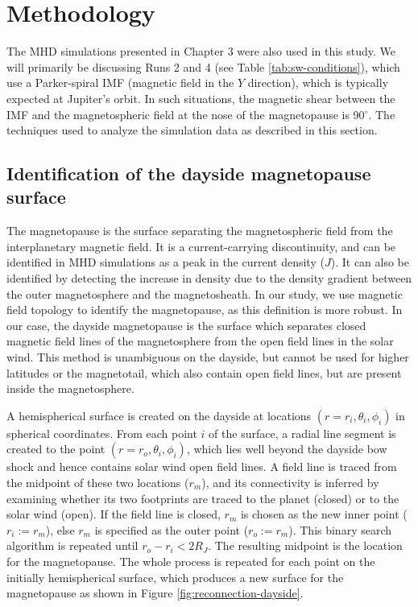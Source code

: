 \section{Methodology}
The MHD simulations presented in Chapter 3 were also used in this study. We will primarily be discussing Runs 2 and 4 (see Table \ref{tab:sw-conditions}), which use a Parker-spiral IMF (magnetic field in the $Y$ direction), which is typically expected at Jupiter's orbit. In such situations, the magnetic shear between the IMF and the magnetospheric field at the nose of the magnetopause is 90$^\circ$. The techniques used to analyze the simulation data as described in this section.

\subsection{Identification of the dayside magnetopause surface}
The magnetopause is the surface separating the magnetospheric field from the interplanetary magnetic field. It is a current-carrying discontinuity, and can be identified in MHD simulations as a peak in the current density ($J$). It can also be identified by detecting the increase in density due to the density gradient between the outer magnetosphere and the magnetosheath. In our study, we use magnetic field topology to identify the magnetopause, as this definition is more robust. In our case, the dayside magnetopause is the surface which separates closed magnetic field lines of the magnetosphere from the open field lines in the solar wind. This method is unambiguous on the dayside, but cannot be used for higher latitudes or the magnetotail, which also contain open field lines, but are present inside the magnetosphere. 

A hemispherical surface is created on the dayside at locations $(r=r_i, \theta_i, \phi_i)$ in spherical coordinates. From each point $i$ of the surface, a radial line segment is created to the point $(r=r_o, \theta_i, \phi_i)$, which lies well beyond the dayside bow shock and hence contains solar wind open field lines. A field line is traced from the midpoint of these two locations ($r_m$), and its connectivity is inferred by examining whether its two footprints are traced to the planet (closed) or to the solar wind (open). If the field line is closed, $r_m$ is chosen as the new inner point ($r_i:=r_m$), else $r_m$ is specified as the outer point ($r_o:=r_m$). This binary search algorithm is repeated until $r_o - r_i < 2 R_J$. The resulting midpoint is the location for the magnetopause. The whole process is repeated for each point on the initially hemispherical surface, which produces a new surface for the magnetopause as shown in Figure \ref{fig:reconnection-dayside}. 

